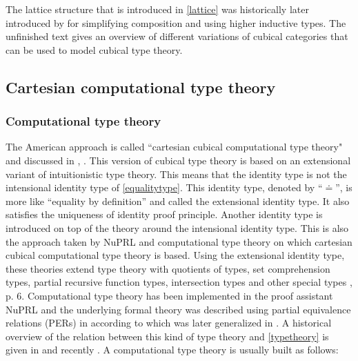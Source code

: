 \documentclass[12pt,a4paper,twoside,xetex]{book}
\begin{document}
The lattice structure that is introduced in \cref{lattice} was historically later introduced by \cite{Huber2016} for simplifying composition and using higher inductive types. The unfinished text \cite{Awodey2016June} gives an overview of different variations of cubical categories that can be used to model cubical type theory.


\subsection{Cartesian computational type theory}\label{comptt}

\subsubsection{Computational type theory}

The American approach is called ``cartesian cubical computational type theory" and discussed in  \cite{Angiuli2017}, \cite{Angiuli2018}. This version of cubical type theory is based on an extensional variant of intuitionistic type theory. This means that the identity type is not the intensional identity type of \cref{equalitytype}. This identity type, denoted by ``$\doteq$'', is more like ``equality by definition'' and called the extensional identity type. It also satisfies the uniqueness of identity proof principle. Another identity type is introduced on top of the theory around the intensional identity type. This is also the approach taken by NuPRL and computational type theory on which cartesian cubical computational type theory is based. Using the extensional identity type, these theories extend type theory with quotients of types, set comprehension types, partial recursive function types, intersection types and other special types \cite{Constable2011}, p. 6.  Computational type theory has been implemented in the proof assistant NuPRL and the underlying formal theory was described using partial equivalence relations (PERs) in \cite{Allen1987} according to \cite{Angiuli2018} which was later generalized in \cite{Harper1991}. A historical overview of the relation between this kind of type theory and \cref{typetheory} is given in \cite{Constable2003} and recently \cite{Constable2015July}. A computational type theory is usually built as follows:
\end{document}
